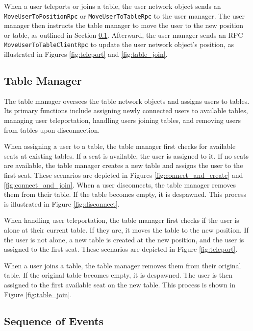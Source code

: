         When a user teleports or joins a table, the user network object sends an \lstinline{MoveUserTo}\lstinline{PositionRpc} or \lstinline{MoveUserToTableRpc} to the user manager. The user manager then instructs the table manager to move the user to the new position or table, as outlined in Section \ref{sec:table_manager}. Afterward, the user manager sends an RPC \lstinline{MoveUserToTableClientRpc} to update the user network object's position, as illustrated in Figures \ref{fig:teleport} and \ref{fig:table_join}.

    \subsection{Table Manager} \label{sec:table_manager}

        The table manager oversees the table network objects and assigns users to tables. Its primary functions include assigning newly connected users to available tables, managing user teleportation, handling users joining tables, and removing users from tables upon disconnection.

        When assigning a user to a table, the table manager first checks for available seats at existing tables. If a seat is available, the user is assigned to it. If no seats are available, the table manager creates a new table and assigns the user to the first seat. These scenarios are depicted in Figures \ref{fig:connect_and_create} and \ref{fig:connect_and_join}. When a user disconnects, the table manager removes them from their table. If the table becomes empty, it is despawned. This process is illustrated in Figure \ref{fig:disconnect}.

        When handling user teleportation, the table manager first checks if the user is alone at their current table. If they are, it moves the table to the new position. If the user is not alone, a new table is created at the new position, and the user is assigned to the first seat. These scenarios are depicted in Figure \ref{fig:teleport}.

        When a user joins a table, the table manager removes them from their original table. If the original table becomes empty, it is despawned. The user is then assigned to the first available seat on the new table. This process is shown in Figure \ref{fig:table_join}.


    \subsection{Sequence of Events} \label{sec:sequence_events}

